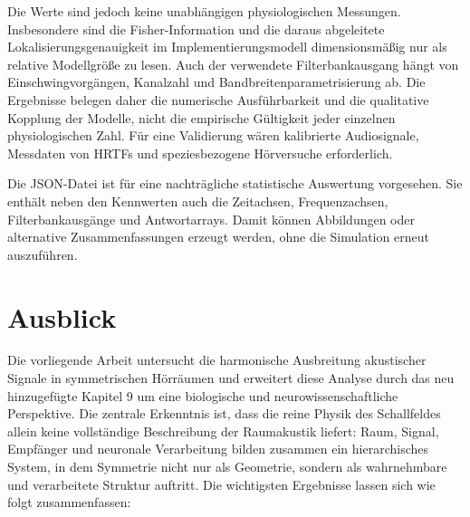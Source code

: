 ﻿\documentclass[12pt, a4paper]{article}
\theoremstyle{definition}
\theoremstyle{remark}
\begin{document}
Die Werte sind jedoch keine unabhängigen physiologischen Messungen. Insbesondere
sind die Fisher-Information und die daraus abgeleitete Lokalisierungsgenauigkeit
im Implementierungsmodell dimensionsmäßig nur als relative Modellgröße zu lesen.
Auch der verwendete Filterbankausgang hängt von Einschwingvorgängen, Kanalzahl
und Bandbreitenparametrisierung ab. Die Ergebnisse belegen daher die numerische
Ausführbarkeit und die qualitative Kopplung der Modelle, nicht die empirische
Gültigkeit jeder einzelnen physiologischen Zahl. Für eine Validierung wären
kalibrierte Audiosignale, Messdaten von HRTFs und speziesbezogene Hörversuche
erforderlich.

Die JSON-Datei ist für eine nachträgliche statistische Auswertung vorgesehen.
Sie enthält neben den Kennwerten auch die Zeitachsen, Frequenzachsen,
Filterbankausgänge und Antwortarrays. Damit können Abbildungen oder alternative
Zusammenfassungen erzeugt werden, ohne die Simulation erneut auszuführen.

\section{Ausblick}
\label{sec:ausblick}

Die vorliegende Arbeit untersucht die harmonische Ausbreitung akustischer Signale
in symmetrischen Hörräumen und erweitert diese Analyse durch das neu hinzugefügte
Kapitel 9 um eine biologische und neurowissenschaftliche Perspektive. Die zentrale
Erkenntnis ist, dass die reine Physik des Schallfeldes allein keine vollständige
Beschreibung der Raumakustik liefert: Raum, Signal, Empfänger und neuronale
Verarbeitung bilden zusammen ein hierarchisches System, in dem Symmetrie nicht nur
als Geometrie, sondern als wahrnehmbare und verarbeitete Struktur auftritt.
Die wichtigsten Ergebnisse lassen sich wie folgt zusammenfassen:
\end{document}
